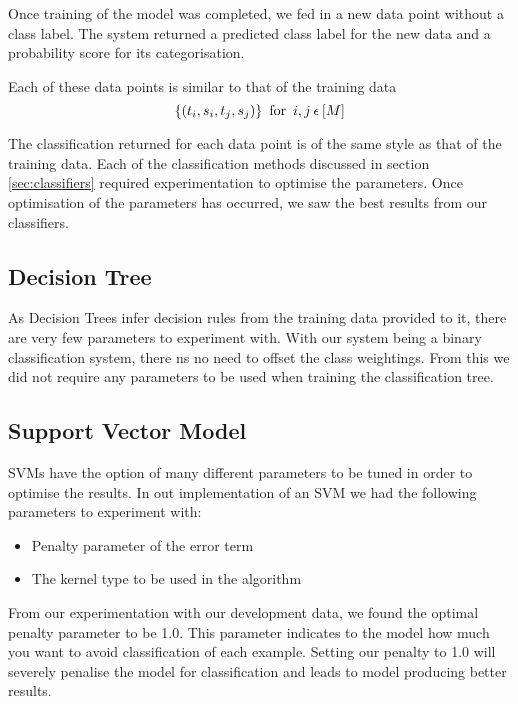 \documentclass[bsc,frontabs,twoside,singlespacing,parskip,deptreport]{infthesis}     %
\begin{document}
Once training of the model was completed, we fed in a new data point without a class label.
The system returned a predicted class label for the new data and a probability score for its categorisation.

Each of these data points is similar to that of the training data
 \begin{equation}
   \{(t_{i},s_{i},t_{j},s_{j})\} \hspace{0.5em} \text{for} \hspace{0.5em} i,j \hspace{0.2em}\epsilon \hspace{0.2em}[M]\nonumber
 \end{equation}

 The classification returned for each data point is of the same style as that of the training data.
 Each of the classification methods discussed in section \ref{sec:classifiers} required experimentation to optimise the
 parameters. Once optimisation of the parameters has occurred, we saw the best results from our classifiers.

 \subsection{Decision Tree}
 As Decision Trees infer decision rules from the training data provided to it, there are very few parameters to
 experiment with. With our system being a binary classification system, there  ns no need to offset the class weightings.
 From this we did not require any parameters to be used when training the classification tree.
 
 \subsection{Support Vector Model}
 SVMs have the option of many different parameters to be tuned in order to optimise the results.
 In out implementation of an SVM we had the following parameters to experiment with:
 \begin{itemize}
 \item Penalty parameter of the error term
 \item The kernel type to be used in the algorithm
 \end{itemize}

 From our experimentation with our development data, we found the optimal penalty parameter to be 1.0.
 This parameter indicates to the model how much you want to avoid classification of each example.
 Setting our penalty to 1.0 will severely penalise the model for classification and leads to model producing
 better results.
\end{document}
